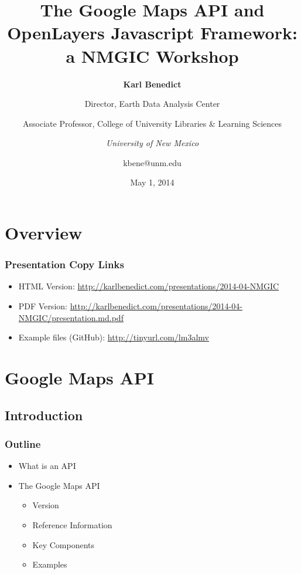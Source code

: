 \documentclass[]{article}
\title{The Google Maps API and OpenLayers Javascript Framework: a NMGIC
Workshop}
\author{\textbf{Karl Benedict} \and Director, Earth Data Analysis Center \and Associate Professor, College of University Libraries \& Learning
Sciences \and \emph{University of New Mexico} \and kbene@unm.edu}
\date{May 1, 2014}
\begin{document}
\maketitle

{
\hypersetup{linkcolor=black}
\setcounter{tocdepth}{3}
\tableofcontents
}
\section{Overview}\label{overview}

\subsubsection{Presentation Copy Links}\label{presentation-copy-links}

\begin{itemize}
\itemsep1pt\parskip0pt
\item
  HTML Version:
  \url{http://karlbenedict.com/presentations/2014-04-NMGIC}
\item
  PDF Version:
  \url{http://karlbenedict.com/presentations/2014-04-NMGIC/presentation.md.pdf}
\item
  Example files (GitHub): \url{http://tinyurl.com/lm3almv}
\end{itemize}

\section{Google Maps API}\label{google-maps-api}

\subsection{Introduction}\label{introduction}

\subsubsection{Outline}\label{outline}

\begin{itemize}
\itemsep1pt\parskip0pt
\item
  What is an API
\item
  The Google Maps API

  \begin{itemize}
  \itemsep1pt\parskip0pt
  \item
    Version
  \item
    Reference Information
  \item
    Key Components
  \item
    Examples
  \end{itemize}
\end{itemize}
\end{document}
